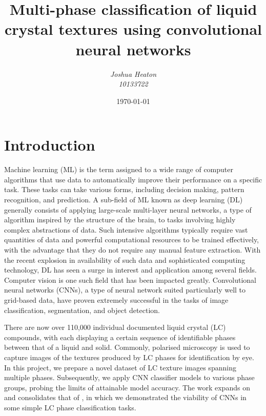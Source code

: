 \documentclass[12pt]{article}
\begin{document}
\title{Multi-phase classification of liquid crystal textures using convolutional neural networks}
\author{\textit{Joshua Heaton}\\\textit{10133722}}
\date{\today}

\maketitle

\begin{abstract}
\end{abstract}

\newpage
\tableofcontents

\newpage
{}

\section{Introduction}
Machine learning (ML) is the term assigned to a wide range of computer algorithms that use data to automatically improve their performance on a specific task. These tasks can take various forms, including decision making, pattern recognition, and prediction. A sub-field of ML known as deep learning (DL) generally consists of applying large-scale multi-layer neural networks, a type of algorithm inspired by the structure of the brain, to tasks involving highly complex abstractions of data. Such intensive algorithms typically require vast quantities of data and powerful computational resources to be trained effectively, with the advantage that they do not require any manual feature extraction. With the recent explosion in availability of such data and sophisticated computing technology, DL has seen a surge in interest and application among several fields. Computer vision is one such field that has been impacted greatly. Convolutional neural networks (CNNs), a type of neural network suited particularly well to grid-based data, have proven extremely successful in the tasks of image classification, segmentation, and object detection.

There are now over 110,000 individual documented liquid crystal (LC) compounds, with each displaying a certain sequence of identifiable phases between that of a liquid and solid. Commonly, polarised microscopy is used to capture images of the textures produced by LC phases for identification by eye. In this project, we prepare a novel dataset of LC texture images spanning multiple phases. Subsequently, we apply CNN classifier models to various phase groups, probing the limits of attainable model accuracy. The work expands on and consolidates that of \cite{Heaton20}, in which we demonstrated the viability of CNNs in some simple LC phase classification tasks.
\end{document}
